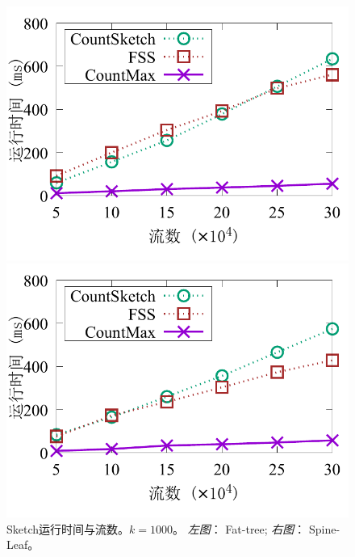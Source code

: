 \begin{figure}[ht]
	\centering
	\begin{minipage}[t]{0.49\linewidth}
		\centering
		\includegraphics[width=\linewidth]{fig/ft_flow_time_1000.pdf}
	\end{minipage}\vspace{-0.6em}%
	\begin{minipage}[t]{0.49\linewidth}
		\centering
		\includegraphics[width=\linewidth]{fig/hy_flow_time_1000.pdf}
	\end{minipage} \vspace{-0.6em}%
	\caption{\textnormal{Sketch运行时间与流数。$k=1000$。 \textit{左图}： Fat-tree; \textit{右图}： Spine-Leaf。}}
	\label{fig:time,f}
\end{figure}

